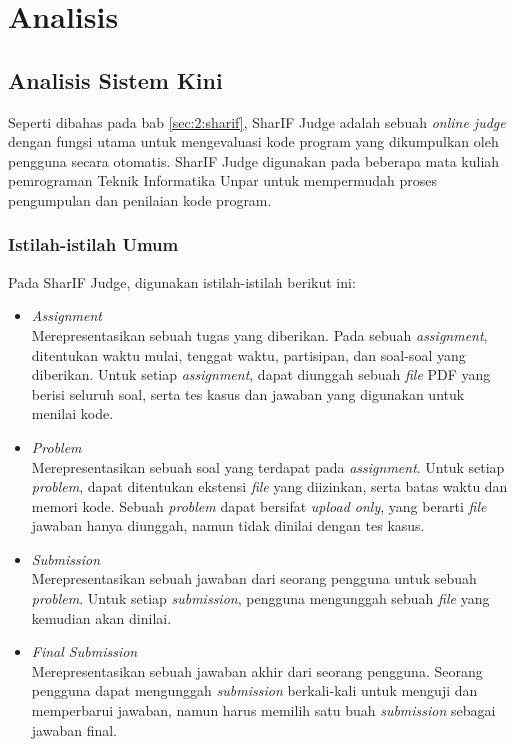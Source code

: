 \chapter{Analisis}
\label{chap:analisis}

\section{Analisis Sistem Kini}
\label{sec:3:analisiskini} 

Seperti dibahas pada bab \ref{sec:2:sharif}, SharIF Judge adalah sebuah \textit{online judge} dengan fungsi utama untuk mengevaluasi kode program yang dikumpulkan oleh pengguna secara otomatis. SharIF Judge digunakan pada beberapa mata kuliah pemrograman Teknik Informatika Unpar untuk mempermudah proses pengumpulan dan penilaian kode program.

\subsection{Istilah-istilah Umum}
\label{subs:3:assignment}

Pada SharIF Judge, digunakan istilah-istilah berikut ini:

\begin{itemize}
    \item \textit{Assignment} \\ Merepresentasikan sebuah tugas yang diberikan. Pada sebuah \textit{assignment}, ditentukan waktu mulai, tenggat waktu, partisipan, dan soal-soal yang diberikan. Untuk setiap \textit{assignment}, dapat diunggah sebuah \textit{file} PDF yang berisi seluruh soal, serta tes kasus dan jawaban yang digunakan untuk menilai kode.
    \item \textit{Problem} \\ Merepresentasikan sebuah soal yang terdapat pada \textit{assignment}. Untuk setiap \textit{problem}, dapat ditentukan ekstensi \textit{file} yang diizinkan, serta batas waktu dan memori kode. Sebuah \textit{problem} dapat bersifat \textit{upload only}, yang berarti \textit{file} jawaban hanya diunggah, namun tidak dinilai dengan tes kasus.
    \item \textit{Submission} \\ Merepresentasikan sebuah jawaban dari seorang pengguna untuk sebuah \textit{problem}. Untuk setiap \textit{submission}, pengguna mengunggah sebuah \textit{file} yang kemudian akan dinilai.
    \item \textit{Final Submission} \\ Merepresentasikan sebuah jawaban akhir dari seorang pengguna. Seorang pengguna dapat mengunggah \textit{submission} berkali-kali untuk menguji dan memperbarui jawaban, namun harus memilih satu buah \textit{submission} sebagai jawaban final.
\end{itemize}


